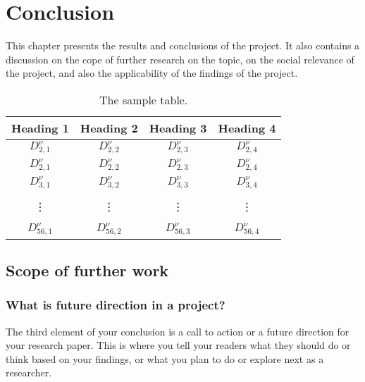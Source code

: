 \chapter{Conclusion}
This chapter presents the results and conclusions of the project. It also contains a discussion on the cope of further research on the topic, on the social relevance of the project, and also the applicability of the findings of the project.
\begin{table}[h]
	\centering
	\begin{tabular}{||c|c|c|c||}  \hline
		\hline
		Heading 1 & Heading 2 & Heading 3 & Heading 4  \\
		\hline \hline
		$D_{2,1}^{\nu}$ & $D_{2,2}^{\nu}$ & $D_{2,3}^{\nu}$ & $D_{2,4}^{\nu}$  \\
		\hline
		$D_{2,1}^{\nu}$ & $D_{2,2}^{\nu}$ & $D_{2,3}^{\nu}$ & $D_{2,4}^{\nu}$  \\
		\hline
		$D_{3,1}^{\nu}$ & $D_{3,2}^{\nu}$ & $D_{3,3}^{\nu}$ & $D_{3,4}^{\nu}$  \\
		\hline
		& & & \\
		\vdots & \vdots & \vdots & \vdots \\
		& & & \\
		\hline
		$D_{56,1}^{\nu}$ & $D_{56,2}^{\nu}$ & $D_{56,3}^{\nu}$ & $D_{56,4}^{\nu}$  \\
		\hline
		\hline
	\end{tabular}
	\caption{The sample table.\label{tab:1}}
\end{table}





\section{Scope of further work}
\subsection{What is future direction in a project?}
The third element of your conclusion is a call to action or a future direction for your research paper. This is where you tell your readers what they should do or think based on your findings, or what you plan to do or explore next as a researcher.


